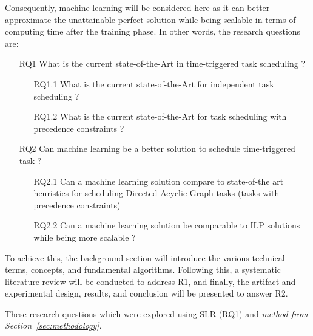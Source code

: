 Consequently, machine learning will be considered here as it can 
better approximate the unattainable perfect solution while being 
scalable in terms of computing time after the training phase. In 
other words, the research questions are:

\begin{itemize}
    \item [RQ1] What is the current state-of-the-Art in time-triggered task scheduling ?
            \begin{itemize}
                \item [RQ1.1] What is the current state-of-the-Art for independent task scheduling ?
                \item [RQ1.2] What is the current state-of-the-Art for task scheduling with precedence constraints ?
            \end{itemize}
    \item [RQ2]  Can machine learning be a better solution to schedule time-triggered task ?
            \begin{itemize}
                \item [RQ2.1] Can a machine learning solution compare to state-of-the art heuristics for scheduling Directed Acyclic Graph tasks (tasks with precedence constraints)
                \item [RQ2.2] Can a machine learning solution be comparable to ILP solutions while being more scalable ?
            \end{itemize}    
\end{itemize}

To achieve this, the background section will introduce the various 
technical terms, concepts, and fundamental algorithms. 
Following this, a systematic literature review will be conducted to address R1, 
and finally, the artifact and experimental design, results, and conclusion will 
be presented to answer R2.



These research questions which were explored using SLR (RQ1) and \textit{method from Section~\ref{sec:methodology}}.


